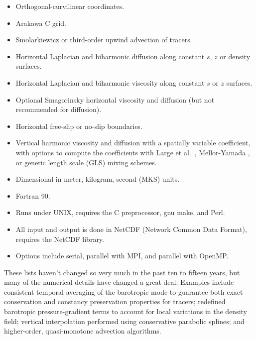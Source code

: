 \begin{klist}
\begin{itemize}
  \item Orthogonal-curvilinear coordinates.
  \item Arakawa C grid.
  \item Smolarkiewicz or third-order upwind advection of tracers.
\end{itemize}
 \mbox{}
\begin{itemize}
  \item Horizontal Laplacian and biharmonic
    diffusion along constant $s$, $z$ or density
    surfaces.
  \item Horizontal Laplacian and biharmonic viscosity
    along constant $s$ or $z$ surfaces.
  \item Optional Smagorinsky horizontal viscosity and diffusion (but
  not recommended for diffusion).
  \item Horizontal free-slip or no-slip boundaries.
  \item Vertical harmonic viscosity and diffusion with a spatially
    variable coefficient, with options to compute the coefficients
    with Large et al.\ \cite{Large94}, Mellor-Yamada \cite{Mellor74},
    or generic length scale (GLS) \cite{Umlauf2001} mixing schemes.
\end{itemize}
 \mbox{}
\begin{itemize}
  \item Dimensional in meter, kilogram, second (MKS) units.
  \item Fortran 90.
  \item Runs under UNIX, requires the C preprocessor, gnu make, and
  Perl.
  \item All input and output is done in NetCDF \cite{netCDF} (Network
    Common Data Format), requires the NetCDF library.
  \item Options include serial, parallel with MPI, and parallel with
  OpenMP.
\end{itemize}
\end{klist}
These lists haven't changed so very much in the past ten to fifteen
years, but many of the numerical details have changed a great deal.
Examples include consistent temporal averaging of the barotropic
mode to guarantee both exact conservation and constancy preservation
properties for tracers; redefined barotropic pressure-gradient terms
to account for local variations in the density field; vertical
interpolation performed using conservative parabolic splines; and
higher-order, quasi-monotone advection algorithms.

